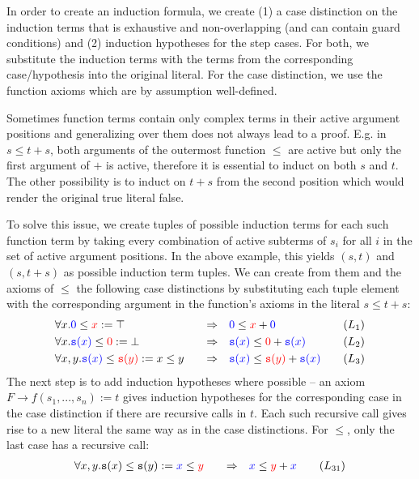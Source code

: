 In order to create an induction formula, we create (1) a case distinction on the induction terms that is exhaustive and non-overlapping (and can contain guard conditions) and (2) induction hypotheses for the step cases. For both, we substitute the induction terms with the terms from the corresponding case/hypothesis into the original literal. For the case distinction, we use the function axioms which are by assumption well-defined.

Sometimes function terms contain only complex terms in their active argument positions and generalizing over them does not always lead to a proof. E.g. in $s\leq t+s$, both arguments of the outermost function $\leq$ are active but only the first argument of $+$ is active, therefore it is essential to induct on both $s$ and $t$. The other possibility is to induct on $t+s$ from the second position which would render the original true literal false.

To solve this issue, we create tuples of possible induction terms for each such function term by taking every combination of active subterms of $s_i$ for all $i$ in the set of active argument positions. In the above example, this yields $(s,t)$ and $(s,t+s)$ as possible induction term tuples. We can create from them and the axioms of $\leq$ the following case distinctions by substituting each tuple element with the corresponding argument in the function's axioms in the literal $s\leq t+s$:
$$\begin{aligned}
&\forall x.\textcolor{blue}{0}\leq \textcolor{red}{x}:=\top\quad&\Rightarrow\quad&\textcolor{blue}{0}\leq \textcolor{red}{x}+\textcolor{blue}{0}\quad&(L_1)\\
&\forall x.\textcolor{blue}{\mathtt{s}(x)}\leq \textcolor{red}{0}:=\bot\quad&\Rightarrow\quad&\textcolor{blue}{\mathtt{s}(x)}\leq \textcolor{red}{0}+\textcolor{blue}{\mathtt{s}(x)}\quad&(L_2)\\
&\forall x,y.\textcolor{blue}{\mathtt{s}(x)}\leq \textcolor{red}{\mathtt{s}(y)}:=x\leq y\quad&\Rightarrow\quad&\textcolor{blue}{\mathtt{s}(x)}\leq \textcolor{red}{\mathtt{s}(y)}+\textcolor{blue}{\mathtt{s}(x)}\quad&(L_3)
\end{aligned}$$
The next step is to add induction hypotheses where possible -- an axiom $F\rightarrow f(s_1,...,s_n):=t$ gives induction hypotheses for the corresponding case in the case distinction if there are recursive calls in $t$. Each such recursive call gives rise to a new literal the same way as in the case distinctions. For $\leq$, only the last case has a recursive call:
$$\begin{aligned}
&\forall x,y.\mathtt{s}(x)\leq \mathtt{s}(y):=\textcolor{blue}{x}\leq \textcolor{red}{y}\quad&\Rightarrow\quad&\textcolor{blue}{x}\leq \textcolor{red}{y}+\textcolor{blue}{x}\quad&(L_{31})
\end{aligned}$$

